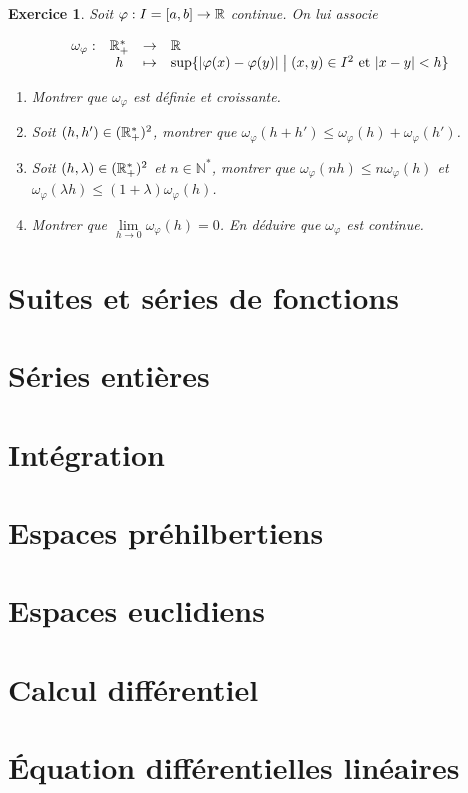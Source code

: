 \documentclass[12pt]{article}
\newtheorem{exercise}{Exercice}[section]
\theoremstyle{remark}
\theoremstyle{remark}
\newcommand{\N}{\mathbb{N}} \newcommand{\Z}{\mathbb{Z}}
\newcommand{\function}[5]{
	$$
	\begin{array}{rccl}
		#1: & #2 & \to & #3 \\
		& #4 & \mapsto & #5
	\end{array}
	$$
}
\begin{document}
\begin{exercise}
	Soit $\varphi:I=[a,b]\to\mathbb{R}$ continue. On lui associe 
	\function{\omega_{\varphi}}{\R_+^*}{\R}{h}{\sup\{\vert\varphi(x)-\varphi(y)\vert\bigm| (x,y)\in I^2\text{ et }\vert x-y\vert <h\}}
	\begin{enumerate}
		\item Montrer que $\omega_{\varphi}$ est définie et croissante.
		\item Soit $(h,h')\in(\mathbb{R}_{+}^{*})^{2}$, montrer que $\omega_{\varphi}(h+h')\leqslant\omega_{\varphi}(h)+\omega_{\varphi}(h')$.
		\item Soit $(h,\lambda)\in(\mathbb{R}_{+}^{*})^{2}$ et $n\in\N^{*}$, montrer que $\omega_{\varphi}(nh)\leqslant n\omega_{\varphi}(h)$ et $\omega_{\varphi}(\lambda h)\leqslant (1+\lambda)\omega_{\varphi}(h)$.
		\item Montrer que $\lim\limits_{h\to 0}\omega_{\varphi}(h)=0$. En déduire que $\omega_{\varphi}$ est continue.
	\end{enumerate}
\end{exercise}

\cleardoublepage
\section{Suites et séries de fonctions}
\cleardoublepage
\section{Séries entières}
\cleardoublepage
\section{Intégration}
\cleardoublepage
\section{Espaces préhilbertiens}
\cleardoublepage
\section{Espaces euclidiens}
\cleardoublepage
\section{Calcul différentiel}
\cleardoublepage
\section{\'Equation différentielles linéaires}
\end{document}
